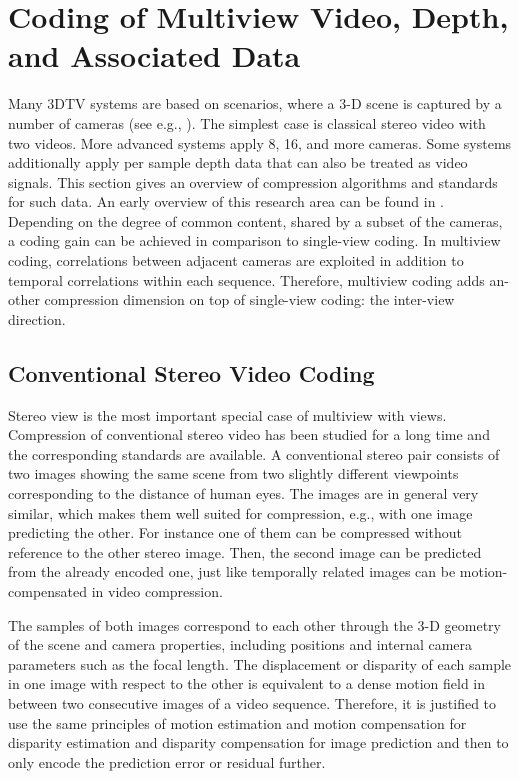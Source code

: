 \section{Coding of Multiview Video, Depth, and Associated Data}

Many 3DTV systems are based on scenarios, where a 3-D scene is captured by a number of cameras (see e.g., ). The simplest case is classical stereo video with two videos. More advanced systems apply 8, 16, and more cameras. Some systems additionally apply per sample depth data that can also be treated as video signals. This section gives an overview of compression algorithms and standards for such data. An early overview of this research area can be found in . Depending on the degree of common content, shared by a subset of the cameras, a coding gain can be achieved in comparison to single-view coding. In multiview coding, correlations between adjacent cameras are exploited in addition to temporal correlations within each sequence. Therefore, multiview coding adds an- other compression dimension on top of single-view coding: the inter-view direction.

\subsection{Conventional Stereo Video Coding}
Stereo view is the most important special case of multiview with views. Compression of conventional stereo video has been studied for a long time and the corresponding standards are available. A conventional stereo pair consists of two images showing the same scene from two slightly different viewpoints corresponding to the distance of human eyes. The images are in general very similar, which makes them well suited for compression, e.g., with one image predicting the other. For instance one of them can be compressed without reference to the other stereo image. Then, the second image can be predicted from the already encoded one, just like temporally related images can be motion-compensated in video compression.

The samples of both images correspond to each other through the 3-D geometry of the scene and camera properties, including positions and internal camera parameters such as the focal length. The displacement or disparity of each sample in one image with respect to the other is equivalent to a dense motion field in between two consecutive images of a video sequence. Therefore, it is justified to use the same principles of motion estimation and motion compensation for disparity estimation and disparity compensation for image prediction and then to only encode the prediction error or residual further.

